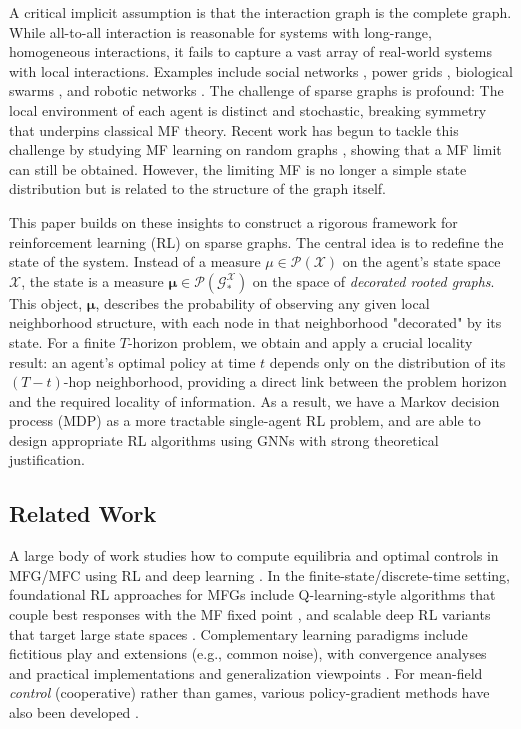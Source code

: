 \documentclass{article}
\begin{document}
A critical implicit assumption is that the interaction graph is the complete graph. While all-to-all interaction is reasonable for systems with long-range, homogeneous interactions, it fails to capture a vast array of real-world systems with local interactions. Examples include social networks \cite{jackson2008social}, power grids \cite{dorfler2013synchronization}, biological swarms \cite{vicsek1995novel}, and robotic networks \cite{bullo2009distributed}.
The challenge of sparse graphs is profound: The local environment of each agent is distinct and stochastic, breaking symmetry that underpins classical MF theory. Recent work has begun to tackle this challenge by studying MF learning on random graphs \cite{caines2021graphon, cui2022learning, fabian2023learning, zhang2024learning, fabian2024learning,  zhang2024learning2, fabian2025learning}, showing that a MF limit can still be obtained. However, the limiting MF is no longer a simple state distribution but is related to the structure of the graph itself.

This paper builds on these insights to construct a rigorous framework for reinforcement learning (RL) on sparse graphs. The central idea is to redefine the state of the system. Instead of a measure $\mu \in \mathcal{P}(\mathcal{X})$ on the agent's state space $\mathcal{X}$, the state is a measure $\boldsymbol{\mu} \in \mathcal{P}(\mathcal{G}_*^{\mathcal{X}})$ on the space of \textit{decorated rooted graphs}. This object, $\boldsymbol{\mu}$, describes the probability of observing any given local neighborhood structure, with each node in that neighborhood "decorated" by its state. For a finite $T$-horizon problem, we obtain and apply a crucial locality result: an agent's optimal policy at time $t$ depends only on the distribution of its $(T-t)$-hop neighborhood, providing a direct link between the problem horizon and the required locality of information. As a result, we have a Markov decision process (MDP) as a more tractable single-agent RL problem, and are able to design appropriate RL algorithms using GNNs with strong theoretical justification.

\subsection{Related Work}
A large body of work studies how to compute equilibria and optimal controls in MFG/MFC using RL and deep learning \cite{perrin2020fictitious, gu2021mean, lauriere2022learning}.
In the finite-state/discrete-time setting, foundational RL approaches for MFGs include Q-learning-style algorithms that couple best responses with the MF fixed point \cite{guo2019learning}, and scalable deep RL variants that target large state spaces \cite{lauriere2022scalable}.
Complementary learning paradigms include fictitious play and extensions (e.g., common noise), with convergence analyses and practical implementations \cite{perrin2020fictitious, lauriere2022scalable} and generalization viewpoints \cite{perrin2021generalization}.
For mean-field \emph{control} (cooperative) rather than games, various policy-gradient methods have also been developed \cite{gu2020q, gu2023dynamic, cui2024learning2, guan2024zero}.
\end{document}
